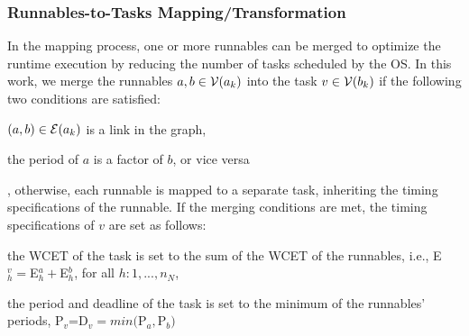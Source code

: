 \subsubsection{Runnables-to-Tasks Mapping/Transformation}\label{subsec_runnables-to-tasks}
In the mapping process, one or more runnables can be merged to optimize the runtime execution by reducing the number of tasks scheduled by the OS. In this work, we merge the runnables $a,b\in \mathcal{V}(a_{k})$ into the task $v\in \mathcal{V}(b_{k})$ if the following two conditions are satisfied:
\begin{enumerate*}[label=(\roman*)]
	\item $(a,b)\in \mathcal{E}(a_{k})$ is a link in the graph,
	\item the period of $a$ is a factor of $b$, or vice versa
\end{enumerate*}, otherwise, each runnable is mapped to a separate task, inheriting the timing specifications of the runnable.
If the merging conditions are met, the timing specifications of $v$ are set as follows: 
\begin{enumerate*}[label=(\roman*)]
	\item the WCET of the task is set to the sum of the WCET of the runnables, i.e., E$_h^v=$E$_h^a + $E$_h^b$, for all $h:1,...,n_N$,
	\item the period and deadline of the task is set to the minimum of the runnables' periods, P$_v$=D$_v=min($P$_a, $P$_b)$
\end{enumerate*}

